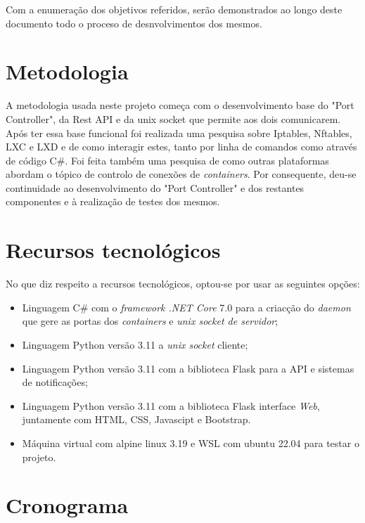Com a enumeração dos objetivos referidos, serão demonstrados ao longo deste documento
todo o proceso de desnvolvimentos dos mesmos.




\section{Metodologia}
\label{sec:intro_method}

A metodologia usada neste projeto começa com o desenvolvimento base do "Port Controller",
da Rest API e da unix socket que permite aos dois comunicarem. Após ter essa base funcional
foi realizada uma pesquisa sobre Iptables, Nftables, LXC e LXD e de como interagir estes, tanto
por linha de comandos como através de código C\#. Foi feita também uma pesquisa de como
outras plataformas abordam o tópico de controlo de conexões de \textit{containers}.
Por consequente, deu-se continuidade ao desenvolvimento do "Port Controller" e dos 
restantes componentes e à realização de testes dos mesmos.


\section{Recursos tecnológicos}
\label{sec:intro_resources}


No que diz respeito a recursos tecnológicos, optou-se por usar as seguintes opções:

\begin{itemize}
\item Linguagem C\# com o \textit{framework .NET Core} 7.0 para a criacção do \textit{daemon} que gere
as portas dos \textit{containers} e \textit{unix socket de servidor};
\item Linguagem Python versão 3.11 a \textit{unix socket} cliente;
\item Linguagem Python versão 3.11 com a biblioteca Flask para a API e sistemas de notificações;
\item Linguagem Python versão 3.11 com a biblioteca Flask interface \textit{Web}, juntamente com HTML, CSS, Javascipt e Bootstrap.
\item Máquina virtual com alpine linux 3.19 e WSL com ubuntu 22.04 para testar o projeto.
\end{itemize}




\section{Cronograma}
\label{sec:intro_chronos}

